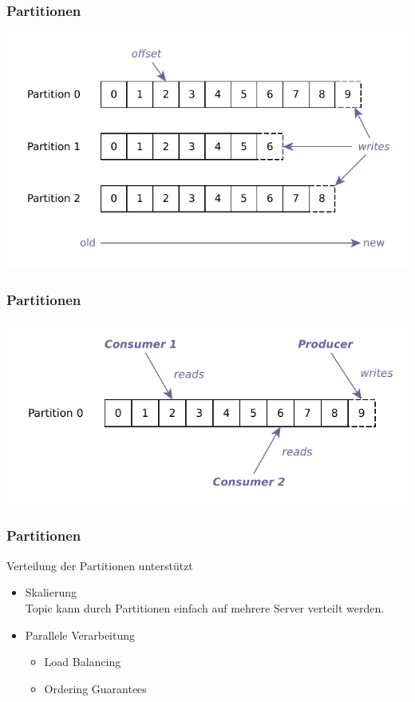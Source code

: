 \begin{frame}
\frametitle{Partitionen}
	\centering
	\includegraphics[scale=0.75]{figure/partitioned_log.pdf}
	
\end{frame}

\begin{frame}
\frametitle{Partitionen}
	\centering
	\includegraphics[scale=0.75]{figure/partition.pdf}
	
\end{frame}

\begin{frame}
\frametitle{Partitionen}
	Verteilung der Partitionen unterstützt
	\begin{itemize}
		\item Skalierung\\
			Topic kann durch Partitionen einfach auf mehrere Server verteilt werden.
		\item Parallele Verarbeitung
		\begin{itemize}
			\item Load Balancing
			\item Ordering Guarantees
		\end{itemize}
	\end{itemize}
\end{frame}


